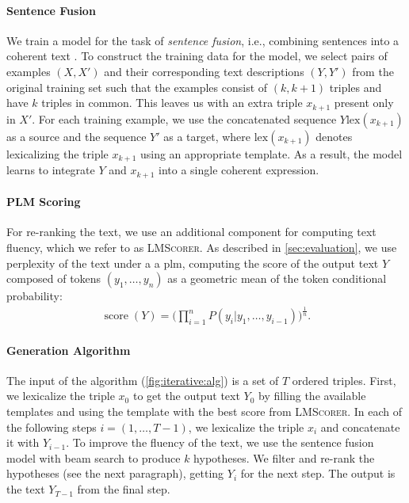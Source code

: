 \paragraph{Sentence Fusion}
We train a model for the task of \emph{sentence fusion}, i.e., combining sentences into a coherent text \cite{barzilay2005sentence}.
To construct the training data for the model, we select pairs of examples $(X, X')$ and their corresponding text descriptions $(Y, Y')$ from the original training set such that the examples consist of $(k, k+1)$ triples and have $k$ triples in common. This leaves us with an extra triple $x_{k+1}$ present only in $X'$. For each training example, we use the concatenated sequence $Y \mathrm{lex}(x_{k+1})$ as a source and the sequence $Y'$ as a target, where $\mathrm{lex}(x_{k+1})$ denotes lexicalizing the triple $x_{k+1}$ using an appropriate template.
As a result, the model learns to integrate $Y$ and $x_{k+1}$ into a single coherent expression.


\paragraph{PLM Scoring} For re-ranking the text, we use an additional component for computing text fluency, which we refer to as \textsc{LMScorer}.
As described in \autoref{sec:evaluation}, we use perplexity of the text under a a \ac{plm}, computing the score of the output text $Y$ composed of tokens $(y_1, \ldots, y_n)$ as a geometric mean of the token conditional probability:
\begin{align}
    \operatorname{score}(Y) = \Bigg( \prod_{i=1}^{n}{P(y_i|y_1, \ldots, y_{i-1})} \Bigg)^{\frac{1}{n}}.
\end{align}




\paragraph{Generation Algorithm}
The input of the algorithm (\autoref{fig:iterative:alg}) is a set of $T$ ordered triples. First, we lexicalize the triple $x_0$ to get the output text $Y_0$ by filling the available templates and using the template with the best score from \textsc{LMScorer}.
In each of the following steps $i=(1, \ldots, T-1)$, we lexicalize the triple $x_i$ and concatenate it with $Y_{i-1}$.  To improve the fluency of the text, we use the sentence fusion model with beam search to produce $k$ hypotheses. We filter and re-rank the hypotheses (see the next paragraph), getting $Y_{i}$ for the next step. The output is the text $Y_{T-1}$ from the final step.


